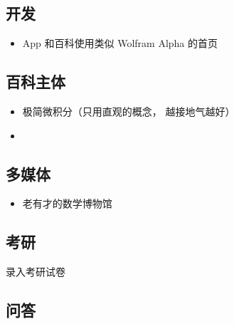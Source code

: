 
\subsection{开发}
\begin{itemize}
\item App 和百科使用类似 Wolfram Alpha 的首页
\end{itemize}

\subsection{百科主体}
\begin{itemize}
\item 极简微积分（只用直观的概念， 越接地气越好）
\item 
\end{itemize}

\subsection{多媒体}
\begin{itemize}
\item 老有才的数学博物馆
\end{itemize}

\subsection{考研}
录入考研试卷

\subsection{问答}
